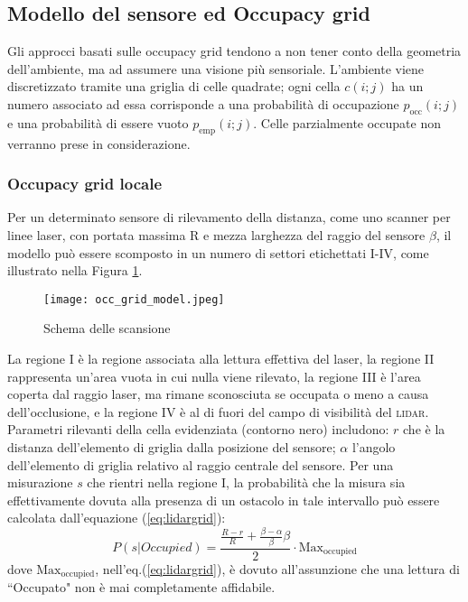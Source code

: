\subsection{Modello del sensore ed Occupacy grid}
\label{sec:occupacygrid}
Gli approcci basati sulle occupacy grid tendono a non tener conto della
geometria dell'ambiente, ma ad assumere una visione più sensoriale.
L'ambiente viene discretizzato tramite una griglia di celle quadrate; ogni
cella $c(i; j)$ ha un numero associato ad essa corrisponde a una probabilità
di occupazione $p_{\text{occ}}(i; j)$ e una probabilità di essere
vuoto $p_{\text{emp}}(i;j)$.
Celle parzialmente occupate non verranno prese in considerazione.

\subsubsection{Occupacy grid locale}
\label{ssec:localoccgrid}
Per un determinato sensore di rilevamento della distanza, come uno scanner per
linee laser, con portata massima R e mezza larghezza del raggio del sensore
$\beta$, il modello può essere scomposto in un numero di settori etichettati
I-IV\cite{ardhaoui2011implementation}, come illustrato nella Figura \ref{fig:scan scheme}.
%
\begin{figure}[htb]
  \texttt{[image: occ\_grid\_model.jpeg]}
  \caption{Schema delle scansione}
  \label{fig:scan scheme}
\end{figure}

\noindent La regione I è la regione associata alla lettura effettiva del laser,
la regione II rappresenta un'area vuota in cui nulla viene rilevato, la
regione III è l'area coperta dal raggio laser, ma rimane sconosciuta se occupata
o meno a causa dell'occlusione, e la regione IV è al di fuori del campo di
visibilità del \textsc{lidar}.
Parametri rilevanti della cella evidenziata (contorno nero) includono: $r$ che
è la distanza dell'elemento di griglia dalla posizione del sensore;
$\alpha$ l'angolo dell'elemento di griglia relativo al raggio centrale del
sensore.
Per una misurazione $s$ che rientri nella regione I, la probabilità che la
misura sia effettivamente dovuta alla presenza di  un ostacolo in tale
intervallo può essere calcolata dall'equazione (\ref{eq:lidargrid}):
%
\begin{equation}
\label{eq:lidargrid}
P(s|Occupied) = \frac{\frac{R-r}{R} + \frac{ \beta- \alpha}{\beta} \beta}{2}
\cdot \text{Max}_{\text{occupied}}
\end{equation}
%
dove $\text{Max}_{\text{occupied}}$, nell'eq.(\ref{eq:lidargrid}), è dovuto
all'assunzione che una lettura di ``Occupato" non è mai completamente
affidabile.
%
